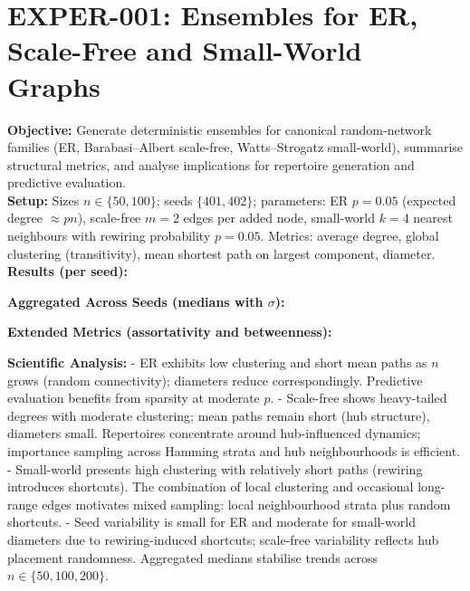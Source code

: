 \documentclass[11pt]{article}
\begin{document}
\section{EXPER-001: Ensembles for ER, Scale-Free and Small-World Graphs}
\textbf{Objective:} Generate deterministic ensembles for canonical random-network families (ER, Barabasi–Albert scale-free, Watts–Strogatz small-world), summarise structural metrics, and analyse implications for repertoire generation and predictive evaluation.\\
\textbf{Setup:} Sizes $n\in\{50,100\}$; seeds $\{401,402\}$; parameters: ER $p=0.05$ (expected degree $\approx pn$), scale-free $m=2$ edges per added node, small-world $k=4$ nearest neighbours with rewiring probability $p=0.05$. Metrics: average degree, global clustering (transitivity), mean shortest path on largest component, diameter.\\
\textbf{Results (per seed):}\\
\begin{center}
\end{center}
\textbf{Aggregated Across Seeds (medians with $\sigma$):}\\
\begin{center}
\end{center}
\textbf{Extended Metrics (assortativity and betweenness):}\\
\begin{center}
\end{center}
\textbf{Scientific Analysis:}
- ER exhibits low clustering and short mean paths as $n$ grows (random connectivity); diameters reduce correspondingly. Predictive evaluation benefits from sparsity at moderate $p$.
- Scale-free shows heavy-tailed degrees with moderate clustering; mean paths remain short (hub structure), diameters small. Repertoires concentrate around hub-influenced dynamics; importance sampling across Hamming strata and hub neighbourhoods is efficient.
- Small-world presents high clustering with relatively short paths (rewiring introduces shortcuts). The combination of local clustering and occasional long-range edges motivates mixed sampling: local neighbourhood strata plus random shortcuts.
- Seed variability is small for ER and moderate for small-world diameters due to rewiring-induced shortcuts; scale-free variability reflects hub placement randomness. Aggregated medians stabilise trends across $n\in\{50,100,200\}$.
\end{document}
